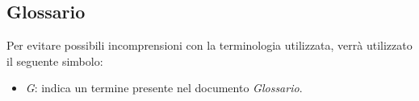 \subsection{Glossario}
    Per evitare possibili incomprensioni con la terminologia utilizzata, verrà utilizzato il seguente simbolo: 
    \begin{itemize}
        \item \textit{G}: indica un termine presente nel documento \textit{Glossario}.  
    \end{itemize}

